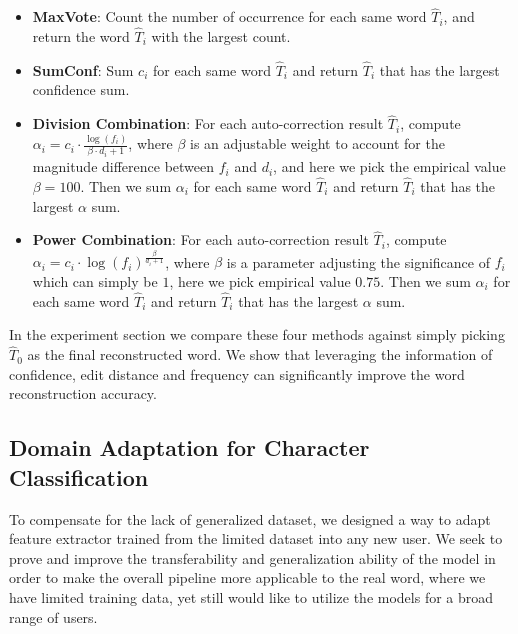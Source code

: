 \documentclass{article}
\begin{document}
\begin{multicols*}{2}
\begin{itemize}[leftmargin=*]
    \item \textbf{MaxVote}: Count the number of occurrence for each same word $\hat{T}_i$, and return the word $\hat{T}_i$ with the largest count.
    \item \textbf{SumConf}: Sum $c_i$ for each same word $\hat{T}_i$ and return $\hat{T}_i$ that has the largest confidence sum.
    \item \textbf{Division Combination}: For each auto-correction result $\hat{T}_i$, compute $\alpha_i = c_i \cdot \frac{\log{(f_i)}}{\beta \cdot d_i + 1}$, where $\beta$ is an adjustable weight to account for the magnitude difference between $f_i$ and $d_i$, and here we pick the empirical value $\beta=100$. Then we sum $\alpha_i$ for each same word $\hat{T}_i$ and return $\hat{T}_i$ that has the largest $\alpha$ sum. 
    \item \textbf{Power Combination}: For each auto-correction result $\hat{T}_i$, compute $\alpha_i = c_i \cdot \log{(f_i)}^{\frac{\beta}{d_i + 1}}$, where $\beta$ is a parameter adjusting the significance of $f_i$ which can simply be $1$, here we pick empirical value $0.75$. Then we sum $\alpha_i$ for each same word $\hat{T}_i$ and return $\hat{T}_i$ that has the largest $\alpha$ sum. 
\end{itemize}

In the experiment section we compare these four methods against simply picking $\hat{T}_0$ as the final reconstructed word. We show that leveraging the information of confidence, edit distance and frequency can significantly improve the word reconstruction accuracy.

\subsection{Domain Adaptation for Character Classification}

To compensate for the lack of generalized dataset, we designed a way to adapt feature extractor trained from the limited dataset into any new user. We seek to prove and improve the transferability and generalization ability of the model in order to make the overall pipeline more applicable to the real word, where we have limited training data, yet still would like to utilize the models for a broad range of users.



\end{multicols*}
\end{document}
